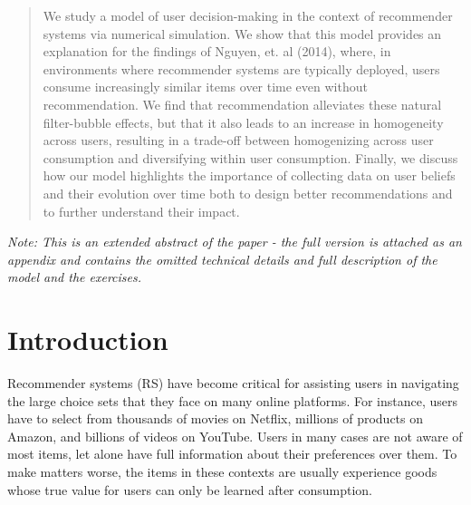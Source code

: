 \documentclass{article}
\begin{document}
\begin{abstract}
We study a model of user decision-making in the context of recommender systems via numerical simulation. We show that this model provides an explanation for the findings of Nguyen, et. al (2014), where, in environments where recommender systems are typically deployed, users consume increasingly similar items over time even without recommendation. We find that recommendation alleviates these natural filter-bubble effects, but that it also leads to an increase in homogeneity across users, resulting in a trade-off between homogenizing across user consumption and diversifying within user consumption. Finally, we discuss how our model highlights the importance of collecting data on user beliefs and their evolution over time both to design better recommendations and to further understand their impact.
\end{abstract}

\textit{Note: This is an extended abstract of the paper - the full version is attached as an appendix and contains the omitted technical details and full description of the model and the exercises.}
\section{Introduction}

Recommender systems (RS) have become critical for assisting users in navigating the large choice sets that they face on many online platforms. For instance, users have to select from thousands of movies on Netflix, millions of products on Amazon, and billions of videos on YouTube. Users in many cases are not aware of most items, let alone have full information about their preferences over them. To make matters worse, the items in these contexts are usually experience goods whose true value for users can only be learned after consumption.
\par
\end{document}
